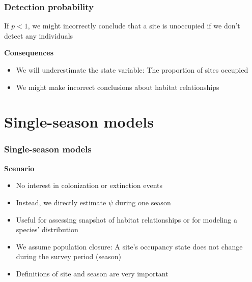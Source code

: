 \documentclass[color=usenames,dvipsnames]{beamer}\usepackage[]{graphicx}\usepackage[]{color}
\begin{document}





\begin{frame}
  \frametitle{Detection probability}
  \large
  {\centering If $p<1$, we might
    incorrectly conclude that a site is unoccupied if we don't detect
    any individuals \par}
  \pause
  \vspace{0.5cm}
  {\bf Consequences}
  \begin{itemize}[<+->]
    \item We will underestimate the state variable: The proportion of
      sites occupied
    \item We might make incorrect conclusions about habitat relationships
  \end{itemize}
\end{frame}







\section{Single-season models}




\begin{frame}
  \frametitle{Single-season models}
  \large
  {\bf Scenario}
  \large
  \begin{itemize}[<+->]
    \item No interest in colonization or extinction events
    \item Instead, we directly estimate $\psi$ during one season
    \item Useful for assessing snapshot of habitat relationships or
      for modeling a species' distribution
    \item We assume \alert{population closure}: A site's occupancy
      state does not change during the survey period (season)
    \item Definitions of site and season are very important
  \end{itemize}
\end{frame}
\end{document}
